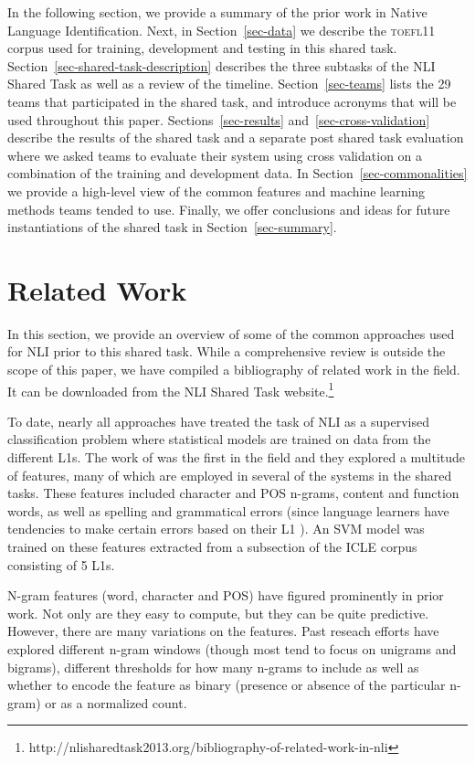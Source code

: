 \documentclass[11pt,letterpaper]{article}
\begin{document}
In the following section, we provide a summary of the prior work in
Native Language Identification.  Next, in Section~\ref{sec-data} we describe
the \textsc{toefl11} corpus used for training, development and testing in
this shared task. Section~\ref{sec-shared-task-description} describes the
three subtasks of the NLI Shared Task as well as a review of the timeline.
Section~\ref{sec-teams} lists the 29 teams that participated
in the shared task, and introduce acronyms that will be used throughout this paper.  Sections~\ref{sec-results}
and~\ref{sec-cross-validation} describe the results of the shared task and a
separate post shared task evaluation where we asked teams to evaluate their
system using cross validation on a combination of the training and development data.  In
Section~\ref{sec-commonalities} we provide a high-level view of the common
features and machine learning methods teams tended to use.  Finally,
we offer conclusions and ideas for future instantiations of the shared task
in Section~\ref{sec-summary}.

\section{Related Work}
\label{sec-relatedwork}

In this section, we provide an overview of some of the common
approaches used for NLI prior to this shared task.  While a
comprehensive review is outside the scope of this paper, we have compiled a
bibliography of related work in the field. It can be downloaded
from the NLI Shared Task website.\footnote{http://nlisharedtask2013.org/bibliography-of-related-work-in-nli}

To date, nearly all approaches have treated the task of NLI as a
supervised classification problem where statistical models are trained on
data from the different L1s.  The work of 
was the first in the field and they explored a multitude of features, many
of which are employed in several of the systems in the shared tasks.  These
features included character and POS n-grams, content and function words,
as well as spelling and grammatical errors (since language learners have
tendencies to make certain errors based on their L1 \cite{SwanSmith01}).
An SVM model was trained on these features extracted from a subsection of
the ICLE corpus consisting of 5 L1s.

N-gram features (word, character and POS)  have figured
prominently in prior work.  Not only are they
easy to compute, but they can be quite predictive.  However, there are
many variations on the features.  Past reseach efforts have explored
different n-gram windows (though most tend to focus on unigrams and bigrams), different thresholds for how many n-grams
to include as well as whether to encode the feature as binary (presence
or absence of the particular n-gram) or as a normalized count.
\end{document}
